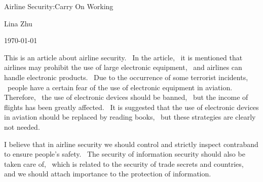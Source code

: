 \documentclass{article}
\begin{document}
	
	
	
	\begin{center}
		
		 Airline Security:Carry On Working
	\end{center}
	\begin{center}
	Lina Zhu
	\end{center}
	\begin{center}
		\today
	\end{center}
	
\par This is an article about airline security.~ In the article,~ it is mentioned that
airlines may prohibit the use of large electronic equipment, ~and airlines can handle
electronic products.~ Due to the occurrence of some terrorist incidents, ~people have
a certain fear of the use of electronic equipment in aviation.~ Therefore, ~the use of
electronic devices should be banned,~ but the income of flights has been greatly affected.
~It is suggested that the use of electronic devices in aviation should be replaced by
reading books,~ but these strategies are clearly not needed.
\par I believe that in airline security we should control and strictly inspect contraband
to ensure people's safety.~ The security of information security should also be taken care
of, ~which is related to the security of trade secrets and countries,~ and we should attach
importance to the protection of information.
\end{document}
